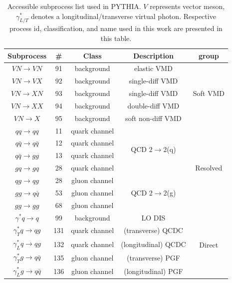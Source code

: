 \begin{table} 
\centering
\begin{tabular} {|c|c|c|c|c|}
\hline
Subprocess			& \#&	Class	&	Description		&	group					 \\
\hline
$VN \rightarrow VN$	& 91& background& elastic VMD		& \multirow{5}{*}{Soft VMD}  \\
$VN \rightarrow VX$	& 92& background& single-diff VMD	& 							  \\
$VN \rightarrow XN$	& 93& background& single-diff VMD	&							  \\
$VN \rightarrow	XX$	& 94& background& double-diff VMD	&							  \\
$VN \rightarrow X$	& 95& background& soft non-diff VMD	&							  \\
\hline
$qq \rightarrow qq$	& 11& quark channel& \multirow{4}{*}{QCD $2\rightarrow 2$(q)} & \multirow{7}{*}{Resolved} \\
$q\bar{q} \rightarrow q\bar{q}$	& 12& quark channel&		&	\\
$q\bar{q} \rightarrow gg$	& 13& quark channel&			&	\\
$gq \rightarrow gq$	& 28& quark channel&					&	\\

$qg \rightarrow qg$	& 28& gluon channel	& \multirow{3}{*}{QCD $2\rightarrow 2$(g)} &	\\
$gg \rightarrow q\bar{q}$ & 53& gluon channel&				&	\\
$gg \rightarrow gg$	& 68& gluon channel	&					&	\\
\hline
$\gamma^{*}q \rightarrow q$	& 99& background& LO DIS	&	\multirow{5}{*}{Direct}	\\
$\gamma^{*}_{T}q \rightarrow qg$ & 131& quark channel& (transverse) QCDC	&	\\
$\gamma^{*}_{L}q \rightarrow qg$ & 132& quark channel& (longitudinal) QCDC	&	\\
$\gamma^{*}_{T}g \rightarrow q\bar{q}$ & 135& gluon channel& (transverse) PGF	&	\\
$\gamma^{*}_{L}g \rightarrow q\bar{q}$ & 136& gluon channel& (longitudinal) PGF	&	\\
\hline
\end{tabular}
\caption[subprocess list in PYTHIA]{Accessible subprocess list used in PYTHIA. $V$ represents vector meson, $\gamma^{*}_{L/T}$ denotes a longitudinal/transverse virtual photon. Respective process id,  classification, and name used in this work are presented in this table.}\label{tab:processList}
\end{table}


